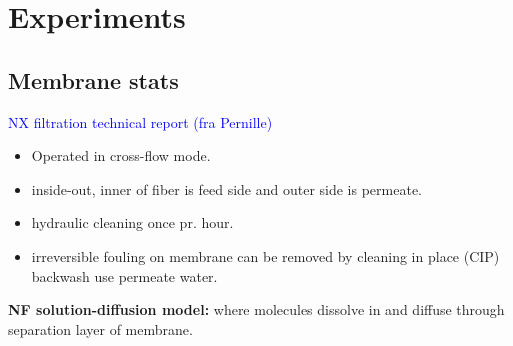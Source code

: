 \chapter{Experiments}


\section{Membrane stats}
\textcolor{blue}{NX filtration technical report (fra Pernille) }

\begin{itemize}
    \item Operated in cross-flow mode.
    \item inside-out, inner of fiber is feed side and outer side is permeate. 
    \item hydraulic cleaning once pr. hour. 
    \item irreversible fouling on membrane can be removed by cleaning in place (CIP) 
    \items backwash use permeate water. 
\end{itemize}

\textbf{NF solution-diffusion model:} where molecules dissolve in and diffuse through separation layer of membrane. 

